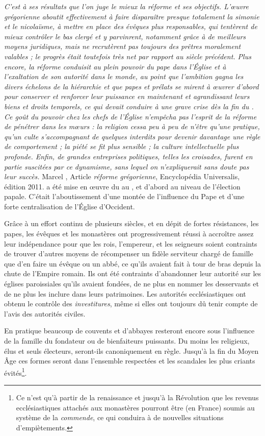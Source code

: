 {\emph{C'est à ses résultats que l'on juge le mieux la réforme et ses objectifs. L'œuvre grégorienne aboutit effectivement à faire disparaître presque totalement la simonie et le nicolaïsme, à mettre en place des évêques plus responsables, qui tentèrent de mieux contrôler le bas clergé et y parvinrent, notamment grâce à de meilleurs moyens juridiques, mais ne recrutèrent pas toujours des prêtres moralement valables ; le progrès était toutefois très net par rapport au siècle précédent. Plus encore, la réforme conduisit au plein pouvoir du pape dans l'Église et à l'exaltation de son autorité dans le monde, au point que l'ambition gagna les divers échelons de la hiérarchie et que papes et prélats se mirent à œuvrer d'abord pour conserver et renforcer leur puissance en maintenant et agrandissant leurs biens et droits temporels, ce qui devait conduire à une grave crise dès la fin du . Ce goût du pouvoir chez les chefs de l'Église n'empêcha pas l'esprit de la réforme de pénétrer dans les mœurs : la religion cessa peu à peu de n'être qu'une pratique, qu'un culte s'accompagnant de quelques interdits pour devenir davantage une règle de comportement ; la piété se fit plus sensible ; la culture intellectuelle plus profonde. Enfin, de grandes entreprises politiques, telles les croisades, furent en partie suscitées par ce dynamisme, sans lequel on n'expliquerait sans doute pas leur succès.}
Marcel , Article \emph{réforme grégorienne}, Encyclopédia Universalis, édition 2011.} 
a été mise en œuvre du  au , et d'abord au niveau de l'élection papale. C'était l'aboutissement d'une montée de l'influence du Pape et d'une forte centralisation de l'Église d'Occident. 

 Grâce à un effort continu de plusieurs siècles, et en dépit de fortes résistances, les papes, les évêques et les monastères ont progressivement réussi à accroître assez leur indépendance pour que les rois, l'empereur, et les seigneurs soient contraints de trouver d'autres moyens de récompenser un fidèle serviteur chargé de famille que d'en faire un évêque ou un abbé, ce qu'ils avaient fait à tour de bras depuis la chute de l'Empire romain. Ils ont été contraints d'abandonner leur autorité sur les églises paroissiales qu'ils avaient fondées, de ne plus en nommer les desservants et de ne plus les inclure dans leurs patrimoines. Les autorités ecclésiastiques ont obtenu le contrôle des \emph{investitures}, même si elles ont toujours dû tenir compte de l'avis des autorités civiles. 

 En pratique beaucoup de couvents et d'abbayes resteront encore sous l'influence de la famille du fondateur ou de bienfaiteurs puissants. Du moins les religieux, élus et seuls électeurs, seront-ils canoniquement en règle. Jusqu'à la fin du Moyen Âge ces formes seront dans l'ensemble respectées et les scandales les plus criants évités\footnote{Ce n'est qu'à partir de la renaissance et jusqu'à la Révolution que les revenus ecclésiastiques attachés aux monastères pourront être (en France) soumis au système de la \emph{commende}, ce qui conduira à de nouvelles situations d'empiètements.}. 
 
